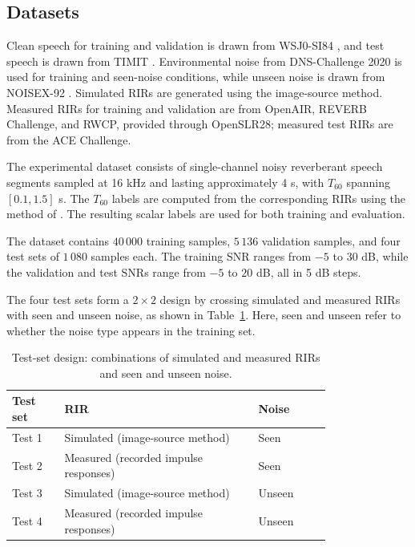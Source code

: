 \documentclass[a4paper,fleqn]{cas-sc}
\begin{document}
\subsection{Datasets}
\label{sec:datasets}



Clean speech for training and validation is drawn from WSJ0-SI84 \citep{paul1992wsj}, and test speech is drawn from TIMIT \citep{garofolo1993timit}. Environmental noise from DNS-Challenge 2020 \citep{reddy2020dns} is used for training and seen-noise conditions, while unseen noise is drawn from NOISEX-92 \citep{varga1993noisex92}. Simulated RIRs are generated using the image-source method. Measured RIRs for training and validation are from OpenAIR, REVERB Challenge, and RWCP, provided through OpenSLR28; measured test RIRs are from the ACE Challenge.



The experimental dataset consists of single-channel noisy reverberant speech segments sampled at 16 kHz and lasting approximately 4 s, with $T_{60}$ spanning $[0.1,1.5]$ s. The $T_{60}$ labels are computed from the corresponding RIRs using the method of \citet{antsalo2001modaldecay}. The resulting scalar labels are used for both training and evaluation.



The dataset contains $40\,000$ training samples, $5\,136$ validation samples, and four test sets of $1\,080$ samples each. The training SNR ranges from $-5$ to $30$ dB, while the validation and test SNRs range from $-5$ to $20$ dB, all in 5 dB steps.



The four test sets form a $2\times 2$ design by crossing simulated and measured RIRs with seen and unseen noise, as shown in Table~\ref{tab:testsets}. Here, seen and unseen refer to whether the noise type appears in the training set.



\begin{table}[pos=htbp]
  \centering
  \caption{Test-set design: combinations of simulated and measured RIRs and seen and unseen noise.}
  \label{tab:testsets}
  \small
  \begin{tabular}{p{0.13\linewidth}p{0.48\linewidth}p{0.18\linewidth}}
    \toprule
    Test set & RIR & Noise \\
    \midrule
    Test 1 & Simulated (image-source method) & Seen \\
    Test 2 & Measured (recorded impulse responses) & Seen \\
    Test 3 & Simulated (image-source method) & Unseen \\
    Test 4 & Measured (recorded impulse responses) & Unseen \\
    \bottomrule
  \end{tabular}
\end{table}
\end{document}
